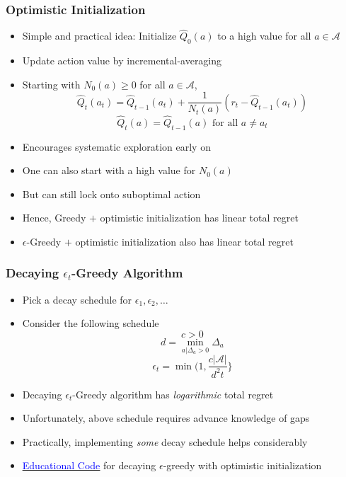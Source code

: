 \documentclass[handout]{beamer}
\begin{document}
\begin{frame}
\frametitle{Optimistic Initialization}
\pause
\begin{itemize}[<+->]
\item Simple and practical idea: Initialize $\hat{Q}_0(a)$ to a high value for all $a\in \mathcal{A}$
\item Update action value by incremental-averaging
\item Starting with $N_0(a) \geq 0$ for all $a\in \mathcal{A}$,
$$\hat{Q}_t(a_t) = \hat{Q}_{t-1}(a_t) + \frac 1 {N_t(a)} (r_t - \hat{Q}_{t-1}(a_t))$$
$$\hat{Q}_t(a) = \hat{Q}_{t-1}(a) \mbox{ for all } a \neq a_t$$
\item Encourages systematic exploration early on
\item One can also start with a high value for $N_0(a)$ 
\item But can still lock onto suboptimal action
\item Hence, Greedy $+$ optimistic initialization has linear total regret
\item $\epsilon$-Greedy $+$ optimistic initialization also has linear total regret
\end{itemize}
\end{frame}

\begin{frame}
\frametitle{Decaying $\epsilon_t$-Greedy Algorithm}
\pause
\begin{itemize}[<+->]
\item Pick a decay schedule for $\epsilon_1, \epsilon_2, \ldots$
\item Consider the following schedule
$$c > 0$$
$$d = \min_{a|\Delta_a > 0} \Delta_a$$
$$\epsilon_t = \min(1, \frac {c|\mathcal{A}|} {d^2t}\}$$
\item Decaying $\epsilon_t$-Greedy algorithm has {\em logarithmic} total regret
\item Unfortunately, above schedule requires advance knowledge of gaps
\item Practically, implementing {\em some} decay schedule helps considerably
\item \href{https://github.com/coverdrive/MDP-DP-RLTikhonJelvis/RL-book/tree/master/rl/chapter14/blob/master/src/algorithms/mab/epsilon_greedy.py}{\underline{\textcolor{blue}{Educational Code}}} for decaying $\epsilon$-greedy with optimistic initialization
\end{itemize}
\end{frame}
\end{document}
